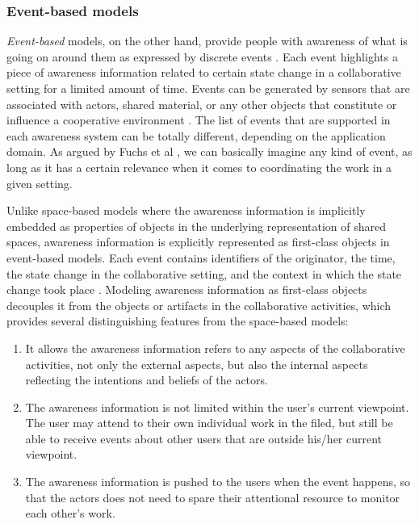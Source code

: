 \subsubsection{Event-based models} %
\label{ssub:event_based_model}
\emph{Event-based} models, on the other hand, provide people with awareness of what is going on around them as expressed by discrete events \cite{rittenbruch2009a}. Each event highlights a piece of awareness information related to certain state change in a collaborative setting for a limited amount of time. Events can be generated by sensors that are associated with actors, shared material, or any other objects that constitute or influence a cooperative environment \cite{prinz1999a}. The list of events that are supported in each awareness system can be totally different, depending on the application domain. As argued by Fuchs et al \cite{Fuchs1995}, we can basically imagine any kind of event, as long as it has a certain relevance when it comes to coordinating the work in a given setting. 

Unlike space-based models where the awareness information is implicitly embedded as properties of objects in the underlying representation of shared spaces, awareness information is explicitly represented as first-class objects in event-based models. Each event contains identifiers of the originator, the time, the state change in the collaborative setting, and the context in which the state change took place \cite{fuchs1999a}. Modeling awareness information as first-class objects decouples it from the objects or artifacts in the collaborative activities, which provides several distinguishing features from the space-based models:

\begin{enumerate}
   \item It allows the awareness information refers to any aspects of the collaborative activities, not only the external aspects, but also the internal aspects reflecting the intentions and beliefs of the actors.
   \item The awareness information is not limited within the user's current viewpoint. The user may attend to their own individual work in the filed, but still be able to receive events about other users that are outside his/her current viewpoint. 
   \item The awareness information is pushed to the users when the event happens, so that the actors does not need to spare their attentional resource to monitor each other's work.
\end{enumerate}

